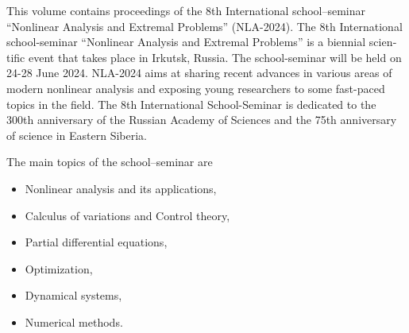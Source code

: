 \documentclass[12pt,final]{llncs}
\begin{document}
 \begin{english}

This volume contains proceedings of the 8th International school--seminar ``Nonlinear Analysis and Extremal Problems'' (NLA-2024).
The 8th International school-seminar ``Nonlinear Analysis and Extremal Problems'' is a biennial scientific event that takes place in Irkutsk, Russia. The school-seminar  will be held on 24-28 June 2024. NLA-2024 aims at sharing recent advances in various areas of modern nonlinear analysis and exposing young researchers to some fast-paced topics in the field. The 8th International School-Seminar is dedicated to the 300th anniversary of the Russian Academy of Sciences and the 75th anniversary of science in Eastern Siberia.


The main topics of the  school--seminar are
\begin{itemize}
\item Nonlinear analysis and its applications,
\item Calculus of variations and Control theory,
\item Partial differential equations,
\item Optimization,
\item Dynamical systems,
\item  Numerical methods.


\end{itemize}
\end{english}
\end{document}
